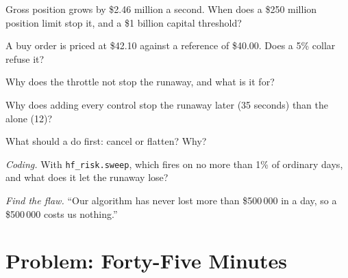 \begin{exercise}[$\star$]\label{exo:hf:risk-controls:2}
Gross position grows by \$2.46 million a second. When does a \$250 million position limit stop it, and a \$1 billion capital threshold?
\end{exercise}

\begin{exercise}[$\star$]\label{exo:hf:risk-controls:3}
A buy order is priced at \$42.10 against a reference of \$40.00. Does a 5\% collar refuse it?
\end{exercise}

\begin{exercise}[$\star\star$]\label{exo:hf:risk-controls:4}
Why does the throttle not stop the runaway, and what is it for?
\end{exercise}

\begin{exercise}[$\star\star$]\label{exo:hf:risk-controls:5}
Why does adding every control stop the runaway later (35 seconds) than the  alone (12)?
\end{exercise}

\begin{exercise}[$\star\star$]\label{exo:hf:risk-controls:6}
What should a  do first: cancel or flatten? Why?
\end{exercise}

\begin{exercise}[$\star\star\star$]\label{exo:hf:risk-controls:7}
\emph{Coding.} With \texttt{hf\_risk.sweep}, which  fires on no more than 1\% of ordinary days, and what does it let the runaway lose?
\end{exercise}

\begin{exercise}[$\star\star\star$]\label{exo:hf:risk-controls:8}
\emph{Find the flaw.} ``Our algorithm has never lost more than \$500\,000 in a day, so a \$500\,000  costs us nothing.''
\end{exercise}

\section{Problem: Forty-Five Minutes}

